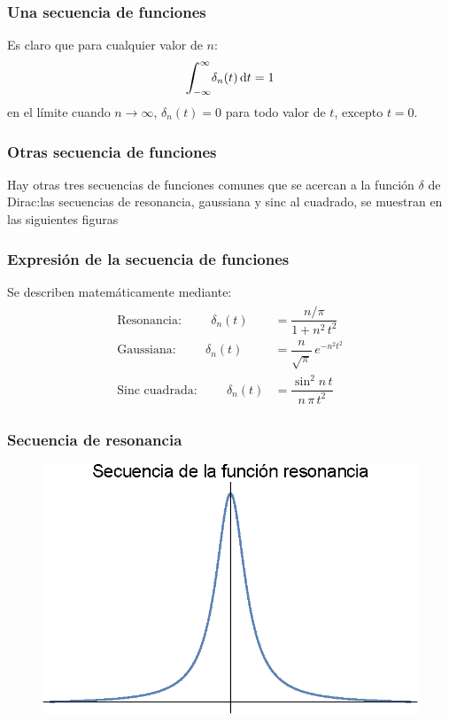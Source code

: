 \documentclass[12pt]{beamer}
\begin{document}
\begin{frame}
\frametitle{Una secuencia de funciones}
Es claro que para cualquier valor de $n$:
\pause
\begin{align*}
\scaleint{6ex}_{\bs -\infty}^{\infty} \delta_{n} (t) \dd{t} = 1
\end{align*}
en el límite cuando $n \to \infty$, $\delta_{n}(t) = 0$ para todo valor de $t$, excepto $t = 0$. 
\end{frame}
\begin{frame}
\frametitle{Otras secuencia de funciones}
Hay otras tres secuencias de funciones comunes que se acercan a la función $\delta$ de Dirac:\pause las secuencias de resonancia, gaussiana y sinc al cuadrado, se muestran en las siguientes figuras%
\end{frame}
\begin{frame}
\frametitle{Expresión de la secuencia de funciones}
Se describen matemáticamente mediante:
\begin{align*}
\begin{aligned}
\mbox{Resonancia:} \hspace{1cm} \delta_{n}(t) &= \dfrac{n/\pi}{1 + n^{2} \, t^{2}} \\[1em]
\mbox{Gaussiana:} \hspace{1cm} \delta_{n}(t) &= \dfrac{n}{\sqrt{\pi}} \, e^{-n^{2} t^{2}} \\[1em]
\mbox{Sinc cuadrada:} \hspace{1cm} \delta_{n}(t) &= \dfrac{\sin^{2} n \, t}{n \, \pi \, t^{2}} 
\end{aligned}
\end{align*}
\end{frame}
\begin{frame}
\frametitle{Secuencia de resonancia}
\begin{figure}[H]
    \centering
    \includegraphics[scale=1]{Imagenes/secuencia_Delta_05.eps}
\end{figure}
\end{frame}
\end{document}
